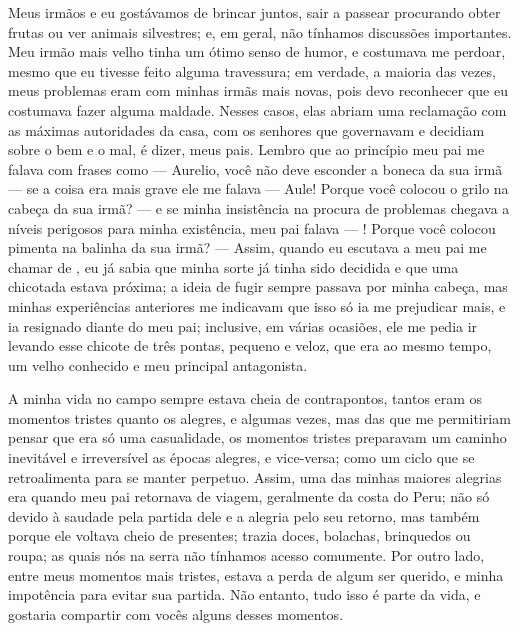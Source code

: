 Meus irmãos e eu gostávamos de brincar juntos, sair a passear procurando obter frutas ou ver animais silvestres; e, em geral, não tínhamos discussões importantes. Meu irmão mais velho tinha um ótimo senso de humor, e costumava me perdoar, mesmo que eu tivesse feito alguma travessura; em verdade, a maioria das vezes, meus problemas eram com minhas irmãs mais novas, pois devo reconhecer que eu costumava fazer alguma maldade.
Nesses casos, elas abriam uma reclamação com as máximas autoridades da casa, com os senhores que governavam e decidiam sobre o bem e o mal, é dizer, meus pais. Lembro que ao princípio meu pai me falava com frases como --- Aurelio, você não deve esconder a boneca da sua irmã --- se a coisa era mais grave ele me falava --- Aule! Porque você colocou o grilo na cabeça da sua irmã? --- e se minha insistência na procura de problemas chegava a níveis perigosos para minha existência, meu pai falava --- \Aulicha! Porque você colocou pimenta na balinha da sua irmã? ---
Assim, quando eu escutava a meu pai me chamar de \Aulicha, eu já sabia que minha sorte já tinha sido decidida e que uma chicotada estava próxima; a ideia de fugir sempre passava por minha cabeça, mas minhas experiências anteriores me indicavam que isso só ia me prejudicar mais, e ia resignado diante do meu pai; inclusive, em várias ocasiões, ele me pedia ir levando esse chicote de três pontas, pequeno e veloz, que era ao mesmo tempo, um velho conhecido e meu principal antagonista.

A minha vida no campo sempre estava cheia de contrapontos, tantos eram os momentos tristes quanto os alegres, e algumas vezes, mas das que me permitiriam pensar que era só uma casualidade, os momentos tristes preparavam um caminho inevitável e irreversível as épocas alegres, e vice-versa; como um ciclo que se retroalimenta para se manter perpetuo. 
Assim, uma das minhas maiores alegrias era quando meu pai retornava de viagem, geralmente da costa do Peru; não só devido à saudade pela partida dele e a alegria pelo seu retorno, mas também porque ele voltava cheio de presentes; trazia doces, bolachas, brinquedos ou roupa; as quais nós na serra não tínhamos acesso comumente.
Por outro lado, entre meus momentos mais tristes, estava a perda de algum ser querido, e minha impotência para evitar sua partida. 
Não entanto, tudo isso é parte da vida, e gostaria compartir com vocês alguns desses momentos.



